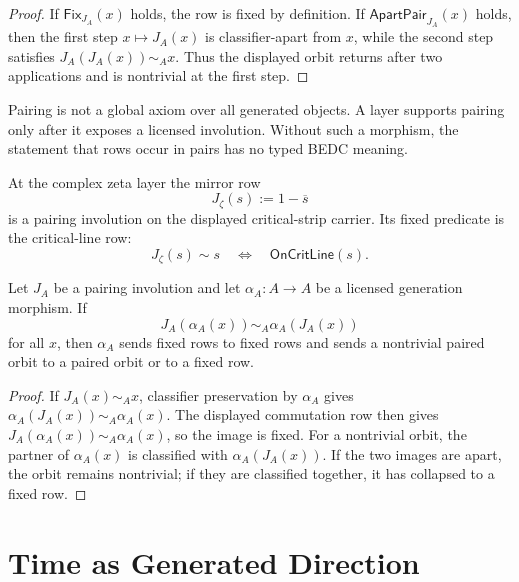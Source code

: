 \begin{proof}
If $\mathsf{Fix}_{J_A}(x)$ holds, the row is fixed by definition. If
$\mathsf{ApartPair}_{J_A}(x)$ holds, then the first step $x\mapsto J_A(x)$
is classifier-apart from $x$, while the second step satisfies
$J_A(J_A(x))\sim_A x$. Thus the displayed orbit returns after two
applications and is nontrivial at the first step.
\end{proof}

\begin{principle}
\label{prin:omega-generation-pairing-requires-involution}
Pairing is not a global axiom over all generated objects. A layer supports
pairing only after it exposes a licensed involution. Without such a
morphism, the statement that rows occur in pairs has no typed BEDC meaning.
\end{principle}

\begin{definition}
\label{def:omega-generation-zeta-mirror-instance}
At the complex zeta layer the mirror row
$$
J_{\zeta}(s):=1-\overline{s}
$$
is a pairing involution on the displayed critical-strip carrier. Its fixed
predicate is the critical-line row:
$$
J_{\zeta}(s)\sim s
\quad\Longleftrightarrow\quad
\mathsf{OnCritLine}(s).
$$
\end{definition}

\begin{theorem}
\label{thm:omega-generation-pairing-compatible-generation}
Let $J_A$ be a pairing involution and let $\alpha_A:A\to A$ be a licensed
generation morphism. If
$$
J_A(\alpha_A(x))
\sim_A
\alpha_A(J_A(x))
$$
for all $x$, then $\alpha_A$ sends fixed rows to fixed rows and sends a
nontrivial paired orbit to a paired orbit or to a fixed row.
\end{theorem}

\begin{proof}
If $J_A(x)\sim_A x$, classifier preservation by $\alpha_A$ gives
$\alpha_A(J_A(x))\sim_A\alpha_A(x)$. The displayed commutation row then
gives $J_A(\alpha_A(x))\sim_A\alpha_A(x)$, so the image is fixed. For a
nontrivial orbit, the partner of $\alpha_A(x)$ is classified with
$\alpha_A(J_A(x))$. If the two images are apart, the orbit remains
nontrivial; if they are classified together, it has collapsed to a fixed
row.
\end{proof}

\section{Time as Generated Direction}
\label{sec:omega-generation-time-direction}

